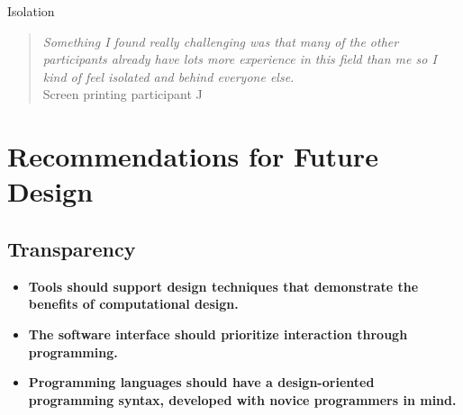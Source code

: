 \documentclass{sigchi}
\begin{document}
Isolation\\
 \begin{quotation}
\textit{Something I found really challenging was that many of the other participants already have lots more experience in this field than me so I kind of feel isolated and behind everyone else.}
\\Screen printing participant J
\end{quotation}


\section{Recommendations for Future Design}
\subsection{Transparency}
\begin{itemize}
\item \textbf{Tools should support design techniques that demonstrate the benefits of computational design.} %
				
\item \textbf{The software interface should prioritize interaction through programming.} %

\item \textbf{Programming languages should have a design-oriented programming syntax, developed with novice programmers in mind.} %
\end{itemize}
\end{document}
